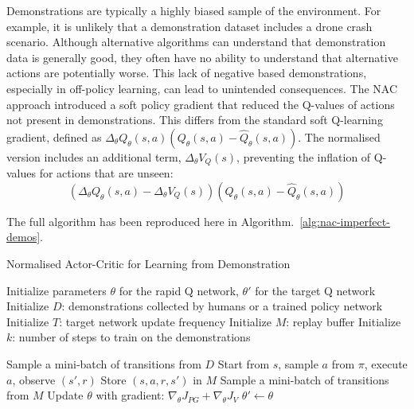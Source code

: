 Demonstrations are typically a highly biased sample of the environment.
For example, it is unlikely that a demonstration dataset includes a drone crash scenario.
Although alternative algorithms can understand that demonstration data is generally good, they often have no ability to understand that alternative actions are potentially worse.
This lack of negative based demonstrations, especially in off-policy learning, can lead to unintended consequences.
The NAC approach introduced a soft policy gradient that reduced the Q-values of actions not present in demonstrations.
This differs from the standard soft Q-learning gradient, defined as $ \Delta_{\theta} Q_{\theta}(s, a)(Q_{\theta}(s, a) - \hat{Q}_{\theta}(s, a)) $.
The normalised version includes an additional term, $\Delta_{\theta} V_Q(s)$, preventing the inflation of Q-values for actions that are unseen:
\[ (\Delta_{\theta} Q_{\theta}(s, a) - \Delta_{\theta} V_Q(s))(Q_{\theta}(s, a) - \hat{Q}_{\theta}(s, a))\]


The full algorithm has been reproduced here in Algorithm.~\ref{alg:nac-imperfect-demos}.

\begin{algorithm}
\label{alg:nac-imperfect-demos}
\caption{Normalised Actor-Critic for Learning from Demonstration~\cite{fyp14-rl-imperfect-demos}}
\begin{algorithmic}[1] %
\State Initialize parameters $\theta$ for the rapid Q network, $\theta'$ for the target Q network
\State Initialize $D$: demonstrations collected by humans or a trained policy network
\State Initialize $T$: target network update frequency
\State Initialize $M$: replay buffer
\State Initialize $k$: number of steps to train on the demonstrations

        \State Sample a mini-batch of transitions from $D$
    \Else
        \State Start from $s$, sample $a$ from $\pi$, execute $a$, observe $(s',r)$
        \State Store $(s, a, r, s')$ in $M$
        \State Sample a mini-batch of transitions from $M$
    \EndIf
    \State Update $\theta$ with gradient: $\nabla_\theta J_{PG} + \nabla_\theta J_V$
        \State $\theta' \gets \theta$
    \EndIf
\EndFor
\end{algorithmic}
\end{algorithm}

